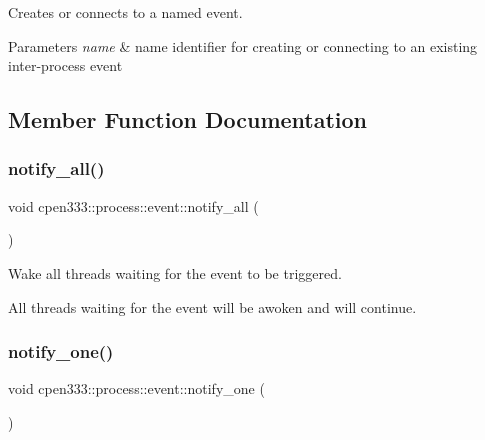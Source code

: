 Creates or connects to a named event. 


\begin{DoxyParams}{Parameters}
{\em name} & name identifier for creating or connecting to an existing inter-\/process event \\
\hline
\end{DoxyParams}


\subsection{Member Function Documentation}
\mbox{\label{classcpen333_1_1process_1_1event_a80184c9e2762fb1a0d7f3a9ff6ae27e7}} 
\subsubsection{\texorpdfstring{notify\+\_\+all()}{notify\_all()}}
{\footnotesize\ttfamily void cpen333\+::process\+::event\+::notify\+\_\+all (\begin{DoxyParamCaption}{ }\end{DoxyParamCaption})\hspace{0.3cm}{\ttfamily [inline]}}



Wake all threads waiting for the event to be triggered. 

All threads waiting for the event will be awoken and will continue. \mbox{\label{classcpen333_1_1process_1_1event_a47077325cc6cb29df3aba00de683ce42}} 
\subsubsection{\texorpdfstring{notify\+\_\+one()}{notify\_one()}}
{\footnotesize\ttfamily void cpen333\+::process\+::event\+::notify\+\_\+one (\begin{DoxyParamCaption}{ }\end{DoxyParamCaption})\hspace{0.3cm}{\ttfamily [inline]}}




